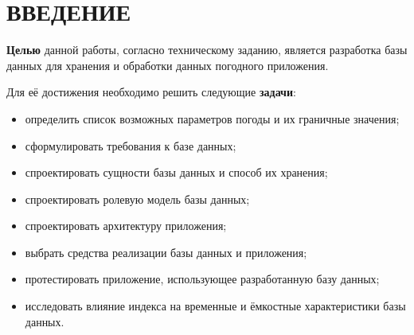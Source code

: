 \chapter*{ВВЕДЕНИЕ}

\textbf{Целью} данной работы, согласно техническому заданию, является разработка базы данных для хранения и обработки данных погодного приложения.

Для её достижения необходимо решить следующие \textbf{задачи}:
\begin{itemize}
    \item определить список возможных параметров погоды и их граничные значения;
    \item сформулировать требования к базе данных;
    \item спроектировать сущности базы данных и способ их хранения;
    \item спроектировать ролевую модель базы данных;
    \item спроектировать архитектуру приложения;
    \item выбрать средства реализации базы данных и приложения;
    \item протестировать приложение, использующее разработанную базу данных;
    \item исследовать влияние индекса на временные и ёмкостные характеристики базы данных.
\end{itemize}